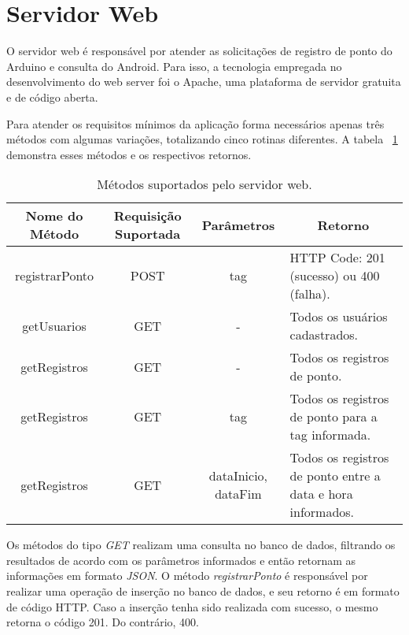 \section{Servidor Web}

O servidor web é responsável por atender as solicitações de registro de ponto do Arduino e consulta do Android. Para isso, a tecnologia empregada no desenvolvimento do web server foi o Apache, uma plataforma de servidor gratuita e de código aberta. 

Para atender os requisitos mínimos da aplicação forma necessários apenas três métodos com algumas variações, totalizando cinco rotinas diferentes. A tabela ~\ref{ws_tabela_metodos} demonstra esses métodos e os respectivos retornos.

\begin{table}[H]
\caption{Métodos suportados pelo servidor web.}
\label{ws_tabela_metodos}
\begin{tabularx}{\textwidth}{|c|c|c|X|}
\hline
\textbf{Nome do Método} & \textbf{Requisição Suportada} & \textbf{Parâmetros} & \multicolumn{1}{c|}{\textbf{Retorno}} \\ \hline
registrarPonto & POST & tag & HTTP Code: 201 (sucesso) ou 400 (falha). \\ \hline
getUsuarios & GET & - & Todos os usuários cadastrados. \\ \hline
getRegistros & GET & - & Todos os registros de ponto. \\ \hline
getRegistros & GET & tag & Todos os registros de ponto para a tag informada. \\ \hline
getRegistros & GET & dataInicio, dataFim & Todos os registros de ponto entre a data e hora informados. \\ \hline
\end{tabularx}
\end{table}

Os métodos do tipo \textit{GET} realizam uma consulta no banco de dados, filtrando os resultados de acordo com os parâmetros informados e então retornam as informações em formato \textit{JSON}. O método \textit{registrarPonto} é responsável por realizar uma operação de inserção no banco de dados, e seu retorno é em formato de código HTTP. Caso a inserção tenha sido realizada com sucesso, o mesmo retorna o código 201. Do contrário, 400.